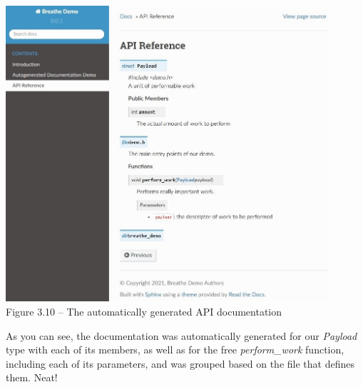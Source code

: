 \begin{center}
\includegraphics[width=0.9\textwidth]{content/1/chapter3/images/10.jpg}\\
Figure 3.10 – The automatically generated API documentation
\end{center}

As you can see, the documentation was automatically generated for our \textit{Payload} type with each of its members, as well as for the free \textit{perform\_work} function, including each of its parameters, and was grouped based on the file that defines them. Neat!

























